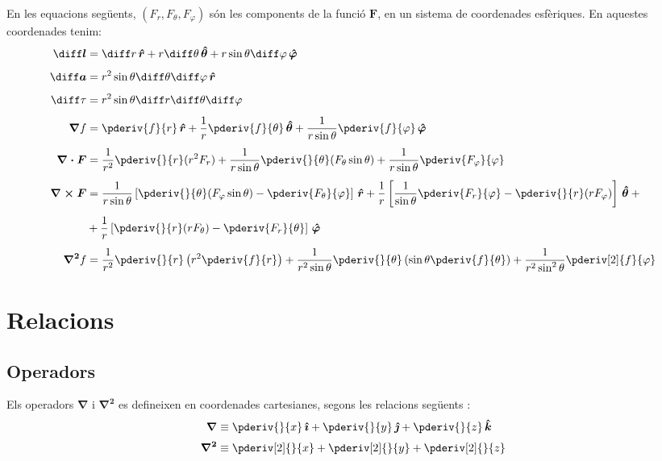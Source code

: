 \documentclass[catalan,a4paper,twoside,11pt]{article}
\begin{document}
\renewcommand{\va}{\ensuremath{\,\boldsymbol{\hat{r}}}}
\renewcommand{\vb}{\ensuremath{\,\boldsymbol{\hat{\theta}}}}
\renewcommand{\vc}{\ensuremath{\,\boldsymbol{\hat{\varphi}}}}
En les equacions seg\"{u}ents, $(F_r,F_\theta,F_\varphi)$  s\'{o}n
les components de la funci\'{o}  $\boldsymbol{F}$, en un sistema de
coordenades esf\`{e}riques. En aquestes coordenades tenim:
\begin{align}
    \boldsymbol{\diff l} &= \diff r \va + r\diff\theta \vb + r \sin\theta\diff \varphi \vc\\[1ex]
    \boldsymbol{\diff a} &= r^2 \sin\theta \diff \theta \diff \varphi \va\\[1ex]
    \diff\tau &= r^2 \sin\theta\diff r \diff \theta \diff \varphi\\[1ex]
    \boldsymbol{\nabla}f &= \pderiv{f}{r}\va + \frac{1}{r}\pderiv{f}{\theta}\vb
    + \frac{1}{r\sin\theta}\pderiv{f}{\varphi}\vc\\[1ex]
    \boldsymbol{\nabla\cdot F} &= \frac{1}{r^2}\pderiv{}{r}(r^2 F_r) +
    \frac{1}{r\sin\theta}\pderiv{}{\theta}(F_\theta\sin\theta)+
    \frac{1}{r\sin\theta}\pderiv{F_\varphi}{\varphi}\\[1ex]
    \boldsymbol{\nabla\times F} &= \frac{1}{r\sin\theta}\left[\pderiv{}{\theta}
    (F_\varphi\sin\theta)-\pderiv{F_\theta}{\varphi}\right]\va +
    \frac{1}{r}\left[\frac{1}{\sin\theta}\pderiv{F_r}{\varphi}-
    \pderiv{}{r}(r F_\varphi)\right]\vb +{} \nonumber \\[1ex]
     &+\frac{1}{r}\left[\pderiv{}{r}(r F_\theta)-\pderiv{F_r}{\theta}\right]\vc\\[1ex]
    \boldsymbol{\nabla^2}f &= \frac{1}{r^2}\pderiv{}{r}\left(r^2\pderiv{f}{r}
    \right) + \frac{1}{r^2\sin\theta}\pderiv{}{\theta}\left(\sin\theta\pderiv{f}{\theta}\right) +
    \frac{1}{r^2\sin^2\theta}\pderiv[2]{f}{\varphi}
\end{align}

\section{Relacions}

\subsection{Operadors}
\renewcommand{\va}{\ensuremath{\,\boldsymbol{\hat{\imath}}}}
\renewcommand{\vb}{\ensuremath{\,\boldsymbol{\hat{\jmath}}}}
\renewcommand{\vc}{\ensuremath{\,\boldsymbol{\hat{k}}}}
Els operadors $\boldsymbol{\nabla}$ i $\boldsymbol{\nabla^2}$ es defineixen en coordenades cartesianes, segons les relacions seg\"{u}ents :
\begin{align}
    \boldsymbol{\nabla} &\equiv \pderiv{}{x}\va + \pderiv{}{y}\vb
    + \pderiv{}{z}\vc\\[0.5ex]
    \boldsymbol{\nabla^2} &\equiv \pderiv[2]{}{x} + \pderiv[2]{}{y}+ \pderiv[2]{}{z}
\end{align}
\end{document}
